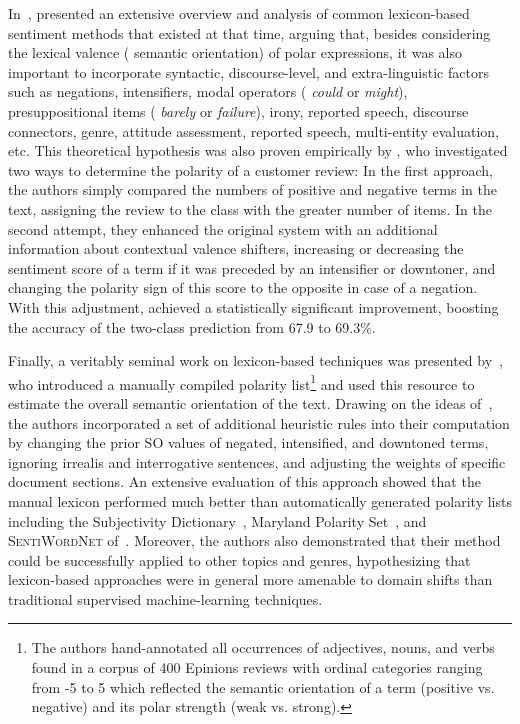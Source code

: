 In~\citeyear{Polanyi:06}, \citeauthor{Polanyi:06} presented an
extensive overview and analysis of common lexicon-based sentiment
methods that existed at that time, arguing that, besides considering
the lexical valence (\ie{} semantic orientation) of polar expressions,
it was also important to incorporate syntactic, discourse-level, and
extra-linguistic factors such as negations, intensifiers, modal
operators (\eg{} \emph{could} or \emph{might}), presuppositional items
(\eg{} \emph{barely} or \emph{failure}), irony, reported speech,
discourse connectors, genre, attitude assessment, reported speech,
multi-entity evaluation, etc.  This theoretical hypothesis was also
proven empirically by \citet{Kennedy:06}, who investigated two ways to
determine the polarity of a customer review: In the first approach,
the authors simply compared the numbers of positive and negative terms
in the text, assigning the review to the class with the greater number
of items.  In the second attempt, they enhanced the original system
with an additional information about contextual valence shifters,
increasing or decreasing the sentiment score of a term if it was
preceded by an intensifier or downtoner, and changing the polarity
sign of this score to the opposite in case of a negation.  With this
adjustment, \citeauthor{Kennedy:06} achieved a statistically
significant improvement, boosting the accuracy of the two-class
prediction from 67.9 to 69.3\%.

Finally, a veritably seminal work on lexicon-based techniques was
presented by~\citet{Taboada:11}, who introduced a manually compiled
polarity list\footnote{The authors hand-annotated all occurrences of
  adjectives, nouns, and verbs found in a corpus of 400 Epinions
  reviews with ordinal categories ranging from -5 to 5 which reflected
  the semantic orientation of a term (positive vs. negative) and its
  polar strength (weak vs. strong).} and used this resource to
estimate the overall semantic orientation of the text.  Drawing on the
ideas of~\citet{Polanyi:06}, the authors incorporated a set of
additional heuristic rules into their computation by changing the
prior SO values of negated, intensified, and downtoned terms, ignoring
irrealis and interrogative sentences, and adjusting the weights of
specific document sections.  An extensive evaluation of this approach
showed that the manual lexicon performed much better than
automatically generated polarity lists including the Subjectivity
Dictionary~\cite{Wilson:05}, Maryland Polarity Set~\cite{Mohammad:09},
and \textsc{SentiWordNet} of~\citet{Esuli:06c}.  Moreover, the authors
also demonstrated that their method could be successfully applied to
other topics and genres, hypothesizing that lexicon-based approaches
were in general more amenable to domain shifts than traditional
supervised machine-learning techniques.

